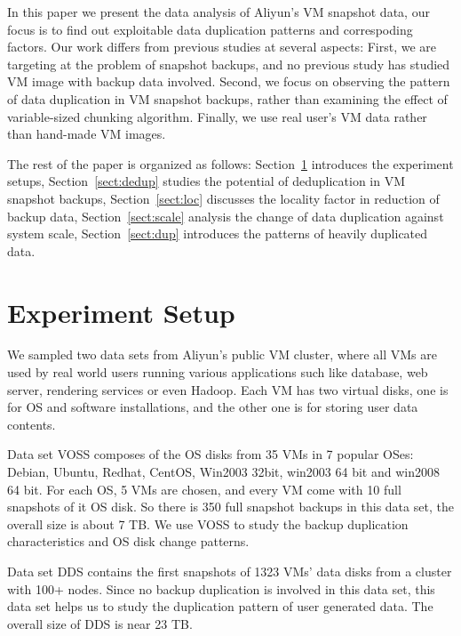 In this paper we present the data analysis of Aliyun's VM snapshot data,
our focus is to find out exploitable data duplication patterns and
correspoding factors.
Our work differs from previous studies at several aspects:
First, we are targeting at the problem of snapshot backups, 
and no previous study has studied VM image with backup data involved.
Second, we focus on observing the pattern of data duplication in VM snapshot backups,
rather than examining the effect of variable-sized chunking algorithm.
Finally, we use real user's VM data rather than hand-made VM images.

The rest of the paper is organized as follows: Section~\ref{sect:setup} introduces
the experiment setups, Section~\ref{sect:dedup} studies the potential of deduplication
in VM snapshot backups, Section~\ref{sect:loc} discusses the locality factor
in reduction of backup data,
Section~\ref{sect:scale} analysis the change of data duplication against system scale,
Section~\ref{sect:dup} introduces the patterns of heavily duplicated data.

\section{Experiment Setup}
\label{sect:setup}
We sampled two data sets from Aliyun's public VM cluster, where all VMs
are used by real world users running various applications such like
database, web server, rendering services or even Hadoop. Each VM has
two virtual disks, one is for OS and software installations, and the other one
is for storing user data contents.

Data set VOSS composes of the OS disks from 35 VMs in 7 popular OSes: 
Debian, Ubuntu, Redhat, CentOS, Win2003 32bit, win2003 64 bit and win2008 64 bit. For each OS, 
5 VMs are chosen, and every VM come with 10 full snapshots of it OS disk. So
there is 350 full snapshot backups in this data set, the overall size is about 7 TB.
We use VOSS to study the backup duplication characteristics and OS disk change patterns.

Data set DDS contains the first snapshots of 1323 VMs' data disks from a cluster with 100+ nodes. 
Since no backup duplication is involved in this data set, this data set helps us to 
study the duplication pattern of user generated data. The overall size of DDS is near 23 TB.